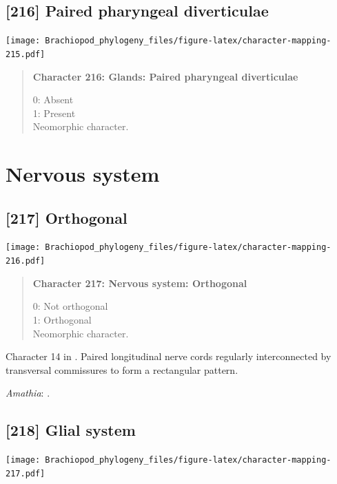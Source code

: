 \documentclass[openany]{book}
\begin{document}
\subsection*{{[}216{]} Paired pharyngeal
diverticulae}\label{paired-pharyngeal-diverticulae}

\texttt{[image: Brachiopod\_phylogeny\_files/figure-latex/character-mapping-215.pdf]}

\begin{quote}
\textbf{Character 216: Glands: Paired pharyngeal diverticulae}

0: Absent\\
1: Present\\
Neomorphic character.
\end{quote}

\section{Nervous system}\label{nervous-system}

\subsection*{{[}217{]} Orthogonal}\label{orthogonal}

\texttt{[image: Brachiopod\_phylogeny\_files/figure-latex/character-mapping-216.pdf]}

\begin{quote}
\textbf{Character 217: Nervous system: Orthogonal}

0: Not orthogonal\\
1: Orthogonal\\
Neomorphic character.
\end{quote}

Character 14 in \citet{Haszprunar1996}. Paired longitudinal nerve cords
regularly interconnected by transversal commissures to form a
rectangular pattern.

\hypertarget{Amathia-coding-217}{}
\emph{Amathia}: \citet{Temereva2016Thenervous}.

\subsection*{{[}218{]} Glial system}\label{glial-system}

\texttt{[image: Brachiopod\_phylogeny\_files/figure-latex/character-mapping-217.pdf]}
\end{document}
